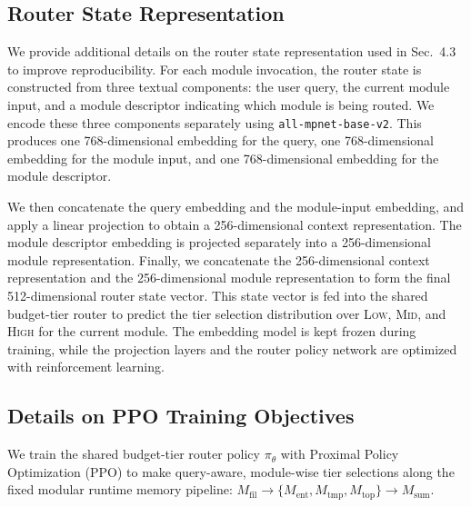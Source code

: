 \subsection{Router State Representation}
\label{appendix:router_state_representation}

We provide additional details on the router state representation used in Sec.~4.3 to improve reproducibility. 
For each module invocation, the router state is constructed from three textual components: the user query, the current module input, and a module descriptor indicating which module is being routed. 
We encode these three components separately using \texttt{all-mpnet-base-v2}. 
This produces one 768-dimensional embedding for the query, one 768-dimensional embedding for the module input, and one 768-dimensional embedding for the module descriptor.

We then concatenate the query embedding and the module-input embedding, and apply a linear projection to obtain a 256-dimensional context representation. 
The module descriptor embedding is projected separately into a 256-dimensional module representation. 
Finally, we concatenate the 256-dimensional context representation and the 256-dimensional module representation to form the final 512-dimensional router state vector. 
This state vector is fed into the shared budget-tier router to predict the tier selection distribution over \textsc{Low}, \textsc{Mid}, and \textsc{High} for the current module. 
The embedding model is kept frozen during training, while the projection layers and the router policy network are optimized with reinforcement learning.





\subsection{Details on PPO Training Objectives}
\label{appendix:ppo}

We train the shared budget-tier router policy $\pi_\theta$ with Proximal Policy Optimization (PPO) to make query-aware, module-wise tier selections along the fixed modular runtime memory pipeline:
$M_{\text{fil}} \rightarrow \{M_{\text{ent}}, M_{\text{tmp}}, M_{\text{top}}\} \rightarrow M_{\text{sum}}$.

